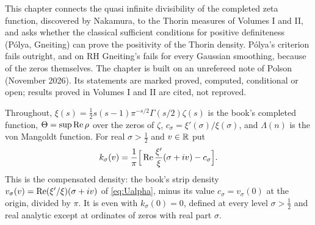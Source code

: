 \label{n:ch:nakamura}

This chapter connects the quasi infinite divisibility of the completed zeta function, discovered by Nakamura, to the Thorin measures of Volumes I and II, and asks whether the classical sufficient conditions for positive definiteness (Pólya, Gneiting) can prove the positivity of the Thorin density. Pólya's criterion fails outright, and on RH Gneiting's fails for every Gaussian smoothing, because of the zeros themselves. The chapter is built on an unrefereed note of Polson (November 2026). Its statements are marked proved, computed, conditional or open; results proved in Volumes I and II are cited, not reproved.

Throughout, $\xi(s)=\frac12s(s-1)\pi^{-s/2}\Gamma(s/2)\zeta(s)$ is the book's completed function, $\Theta=\sup\operatorname{Re}\rho$ over the zeros of $\zeta$, $c_\sigma=\xi'(\sigma)/\xi(\sigma)$, and $\Lambda(n)$ is the von Mangoldt function. For real $\sigma>\frac12$ and $v\in\mathbb{R}$ put
\begin{equation}\label{n:eq:k}
k_\sigma(v)=\frac1\pi\Big[\operatorname{Re}\frac{\xi'}{\xi}(\sigma+iv)-c_\sigma\Big].
\end{equation}
This is the compensated density: the book's strip density $v_\sigma(v)=\operatorname{Re}(\xi'/\xi)(\sigma+iv)$ of \eqref{eq:Ualpha}, minus its value $c_\sigma=v_\sigma(0)$ at the origin, divided by $\pi$. It is even with $k_\sigma(0)=0$, defined at every level $\sigma>\frac12$ and real analytic except at ordinates of zeros with real part $\sigma$.

